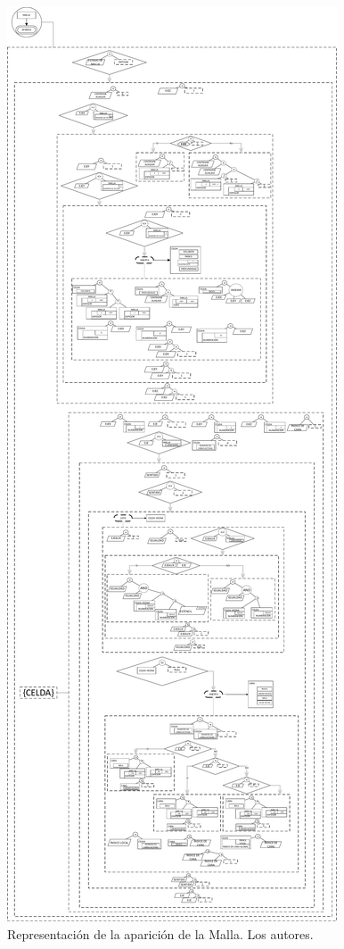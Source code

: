 \begin{figure}[b]
	\centering%
	\includegraphics[height=\textheight]{Fig/MallaAparece.pdf}%
	\caption{Representación de la aparición de la Malla. Los autores.} \label{fig:MeshAppears}
\end{figure}

